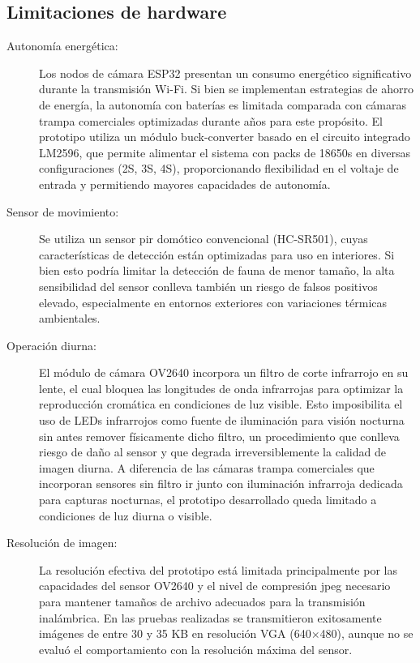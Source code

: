 \documentclass[a4paper, 12pt]{report}
\begin{document}
\subsection{Limitaciones de hardware}

\begin{description}
  \item[Autonomía energética:] Los nodos de cámara \gls{ESP32} presentan un
    consumo energético significativo durante la transmisión Wi-Fi. Si
    bien se implementan estrategias de ahorro de energía, la autonomía
    con baterías es limitada comparada con cámaras trampa comerciales
    optimizadas durante años para este propósito. El prototipo utiliza
    un módulo \gls{buck-converter} basado en el circuito integrado LM2596,
    que permite alimentar el sistema con packs de \glspl{18650}
    en diversas configuraciones (2S, 3S, 4S), proporcionando flexibilidad
    en el voltaje de entrada y permitiendo mayores capacidades de
    autonomía.

  \item[Sensor de movimiento:] Se utiliza un sensor \gls{pir} domótico
    convencional (HC-SR501), cuyas características de detección están
    optimizadas para uso en interiores. Si bien esto podría limitar la
    detección de fauna de menor tamaño, la alta sensibilidad del sensor
    conlleva también un riesgo de falsos positivos elevado, especialmente
    en entornos exteriores con variaciones térmicas ambientales.

  \item[Operación diurna:] El módulo de cámara OV2640 incorpora un filtro
    de corte infrarrojo en su lente, el cual bloquea las longitudes de onda
    infrarrojas para optimizar la reproducción cromática en condiciones de
    luz visible. Esto imposibilita el uso de LEDs infrarrojos como fuente
    de iluminación para visión nocturna sin antes remover físicamente dicho
    filtro, un procedimiento que conlleva riesgo de daño al sensor y que
    degrada irreversiblemente la calidad de imagen diurna. A diferencia de
    las cámaras trampa comerciales que incorporan sensores sin filtro
    \gls{ir} junto con iluminación infrarroja dedicada para capturas
    nocturnas, el prototipo desarrollado queda limitado a condiciones de
    luz diurna o visible.

  \item[Resolución de imagen:] La resolución efectiva del prototipo está
    limitada principalmente por las capacidades del sensor OV2640 y el
    nivel de compresión \gls{jpeg} necesario para mantener tamaños de
    archivo adecuados para la transmisión inalámbrica. En las pruebas
    realizadas se transmitieron exitosamente imágenes de entre 30 y
    35 KB en resolución VGA (640$\times$480), aunque no se evaluó el
    comportamiento con la resolución máxima del sensor.
\end{description}
\end{document}

